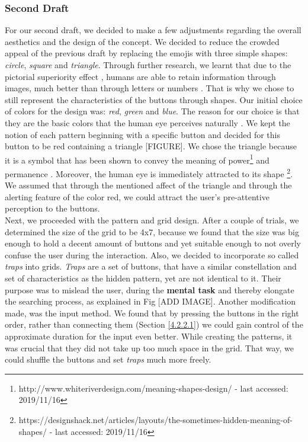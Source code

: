 \subsubsection{Second Draft} \label{4.2.2.3}

For our second draft, we decided to make a few adjustments regarding the overall aesthetics and the design of the concept. We decided to reduce the crowded appeal of the previous draft by replacing the emojis with three simple shapes: \textit{circle}, \textit{square} and \textit{triangle}. Through further research, we learnt that due to the pictorial superiority effect \cite{pictorial}, humans are able to retain information through images, much better than through letters or numbers \cite{pictorial, 2014}. That is why we chose to still represent the characteristics of the buttons through shapes. Our initial choice of colors for the design was: \textit{red}, \textit{green} and \textit{blue}. The reason for our choice is that they are the basic colors that the human eye perceives naturally \cite{Butz2014}. We kept the notion of each pattern beginning with a specific button and decided for this button to be red containing a triangle [FIGURE]. We chose the triangle because it is a symbol that has been shown to convey the meaning of power\footnote{http://www.whiteriverdesign.com/meaning-shapes-design/ - last accessed: 2019/11/16} and permanence \cite{Frutiger1998}.  Moreover, the human eye is immediately attracted to its shape \footnote{https://designshack.net/articles/layouts/the-sometimes-hidden-meaning-of-shapes/ - last accessed: 2019/11/16}. We assumed that through the mentioned affect of the triangle and through the alerting feature of the color red, we could attract the user's pre-attentive perception to the buttons. \\

Next, we proceeded with the pattern and grid design. After a couple of trials, we determined the size of the grid to be 4x7, because we found that the size was big enough to hold a decent amount of buttons and yet suitable enough to not overly confuse the user during the interaction. Also, we decided to incorporate so called \textit{traps} into grids. \textit{Traps} are a set of buttons, that have a similar constellation and set of characteristics as the hidden pattern, yet are not identical to it. Their purpose was to mislead the user, during the \textbf{mental task} and thereby elongate the searching process, as explained in Fig [ADD IMAGE]. Another modification made, was the input method. We found that by pressing the buttons in the right order, rather than connecting them (Section \ref{4.2.2.1}) we could gain control of the approximate duration for the input even better. While creating the patterns, it was crucial that they did not take up too much space in the grid. That way, we could shuffle the buttons and set \textit{traps} much more freely. 

